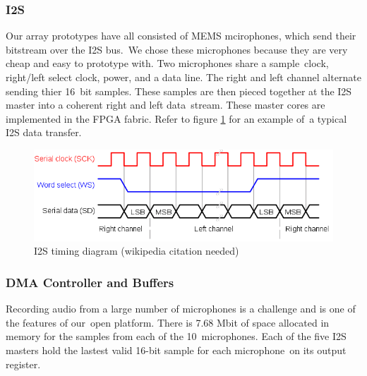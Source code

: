 \documentclass{article}
\begin{document}
\subsubsection{I2S}
Our array prototypes have all consisted of MEMS mcirophones, which send their bitstream over the I2S bus.\
We chose these microphones because they are very cheap and easy to prototype with. Two microphones share a sample\
clock, right/left select clock, power, and a data line. The right and left channel alternate sending thier 16\
bit samples. These samples are then pieced together at the I2S master into a coherent right and left data\
stream. These master cores are implemented in the FPGA fabric. Refer to figure \ref{i2s_timing} for an example of\
a typical I2S data transfer.

\begin{figure}[h]
	\includegraphics[scale=.5]{i2s_timing.png}
	\centering
	\caption{I2S timing diagram (wikipedia citation needed)}
	\label{i2s_timing}
\end{figure}

\newpage

\subsubsection{DMA Controller and Buffers}
Recording audio from a large number of microphones is a challenge and is one of the features of our\
open platform. There is 7.68 Mbit of space allocated in memory for the samples from each of the 10\
microphones. Each of the five I2S masters hold the lastest valid 16-bit sample for each microphone\
on its output register. 
\end{document}
